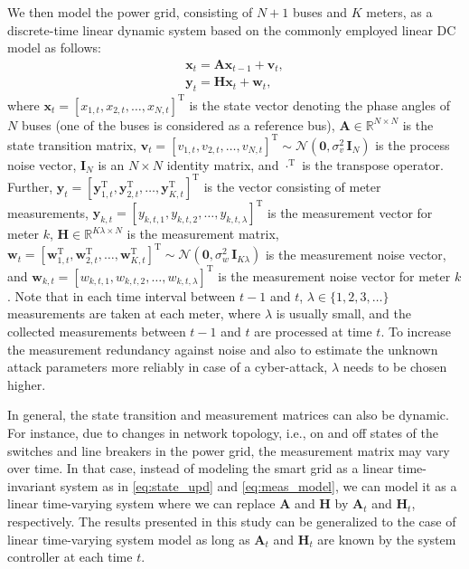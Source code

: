 \documentclass[onecolumn]{IEEEtran}
\begin{document}
We then model the power grid, consisting of $N+1$ buses and $K$ meters, as a discrete-time linear dynamic system based on the commonly employed linear DC model \cite{Abur04,Liu09,Cui12} as follows:
\begin{gather} \label{eq:state_upd}
\mathbf{x}_t = \mathbf{A} \mathbf{x}_{t-1} + \mathbf{v}_t, \\ \label{eq:meas_model}
\mathbf{y}_t = \mathbf{H} \mathbf{x}_t + \mathbf{w}_t,
\end{gather}
where $\mathbf{x}_{t} = [x_{1,t}, x_{2,t}, \dots, x_{N,t}]^\mathrm{T}$ is the state vector denoting the phase angles of $N$ buses (one of the buses is considered as a reference bus), $\mathbf{A} \in \mathbb{R}^{N \times N}$ is the state transition matrix, $\mathbf{v}_t = [v_{1,t}, v_{2,t}, \dots, v_{N,t}]^\mathrm{T} \sim \mathbf{\mathcal{N}}(\mathbf{0},\sigma_v^2 \, \mathbf{I}_N)$ is the process noise vector, $\mathbf{I}_N$ is an ${N \times N}$ identity matrix, and $\cdot^\mathrm{T}$ is the transpose operator. Further, $\mathbf{y}_t = [\mathbf{y}_{1,t}^\mathrm{T}, \mathbf{y}_{2,t}^\mathrm{T}, \dots, \mathbf{y}_{K,t}^\mathrm{T}]^\mathrm{T}$ is the vector consisting of meter measurements, $\mathbf{y}_{k,t} = [y_{k,t,1}, y_{k,t,2}, \dots, y_{k,t,\lambda}]^\mathrm{T}$ is the measurement vector for meter $k$, $\mathbf{H} \in \mathbb{R}^{K \lambda \times N}$ is the measurement matrix, $\mathbf{w}_t = [\mathbf{w}_{1,t}^\mathrm{T}, \mathbf{w}_{2,t}^\mathrm{T}, \dots, \mathbf{w}_{K,t}^\mathrm{T}]^\mathrm{T} \sim \mathbf{\mathcal{N}}(\mathbf{0},\sigma_w^2 \, \mathbf{I}_{K \lambda})$ is the measurement noise vector, and $\mathbf{w}_{k,t} = [w_{k,t,1}, w_{k,t,2}, \dots, w_{k,t,\lambda}]^\mathrm{T}$ is the measurement noise vector for meter $k$. Note that in each time interval between $t-1$ and $t$, $\lambda \in \{1,2,3,\dots\}$ measurements are taken at each meter, where $\lambda$ is usually small, and the collected measurements between $t-1$ and $t$ are processed at time $t$. To increase the measurement redundancy against noise and also to estimate the unknown attack parameters more reliably in case of a cyber-attack, $\lambda$ needs to be chosen higher. %

{In general, the state transition and measurement matrices can also be dynamic. For instance, due to changes in network topology, i.e., on and off states of the switches and line breakers in the power grid, the measurement matrix may vary over time. In that case, instead of modeling the smart grid as a linear time-invariant system as in \eqref{eq:state_upd} and \eqref{eq:meas_model}, we can model it as a linear time-varying system where we can replace $\mathbf{A}$ and $\mathbf{H}$ by $\mathbf{A}_t$ and $\mathbf{H}_t$, respectively. The results presented in this study can be generalized to the case of linear time-varying system model as long as $\mathbf{A}_t$ and $\mathbf{H}_t$ are known by the system controller at each time $t$.}
\end{document}
